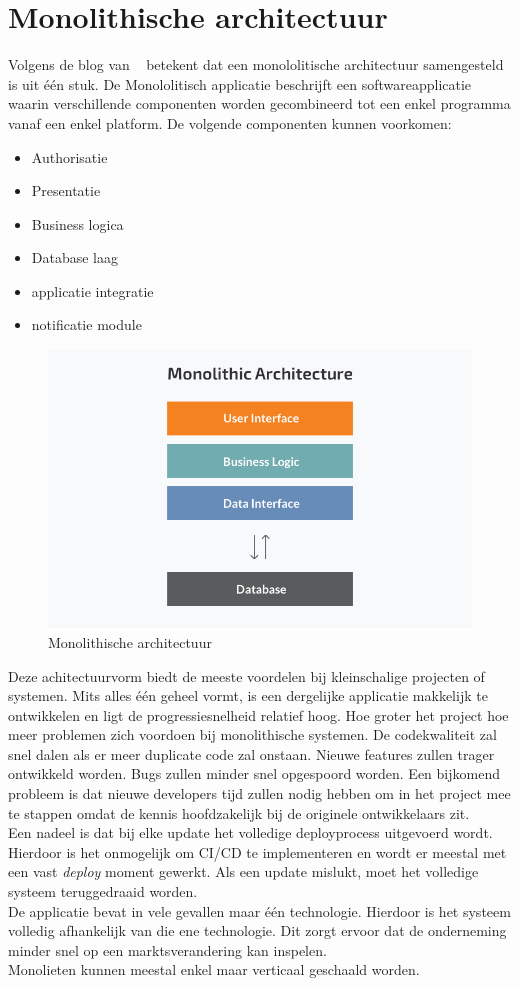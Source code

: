 \section{Monolithische architectuur}
Volgens de blog van ~\autocite{Monolith2014} betekent dat een monololitische architectuur samengesteld is uit één stuk. De Monololitisch applicatie beschrijft een softwareapplicatie waarin verschillende componenten worden gecombineerd tot een enkel programma vanaf een enkel platform. De volgende componenten kunnen voorkomen:
\begin{itemize}
    \item Authorisatie
    \item Presentatie
    \item Business logica
    \item Database laag
    \item applicatie integratie
    \item notificatie module
\end{itemize}
\begin{figure}[!htb]
    \caption{Monolithische architectuur}
    \centering
    \includegraphics[width=1\textwidth]{Monoliet.png}
\end{figure}
Deze achitectuurvorm biedt de meeste voordelen bij kleinschalige projecten of systemen. Mits alles één geheel vormt, is een dergelijke applicatie makkelijk te ontwikkelen en ligt de progressiesnelheid relatief hoog. Hoe groter het project hoe meer problemen zich voordoen bij monolithische systemen. De codekwaliteit zal snel dalen als er meer duplicate code zal onstaan. Nieuwe features zullen trager ontwikkeld worden. Bugs zullen minder snel opgespoord worden. Een bijkomend probleem is dat nieuwe developers tijd zullen nodig hebben om in het project mee te stappen omdat de kennis hoofdzakelijk bij de originele ontwikkelaars zit. \\
Een nadeel is dat bij elke update het volledige deployprocess uitgevoerd wordt. Hierdoor is het onmogelijk om CI/CD te implementeren en wordt er meestal met een vast \emph{deploy} moment gewerkt. Als een update mislukt, moet het volledige systeem teruggedraaid worden.\\
De applicatie bevat in vele gevallen maar één technologie. Hierdoor is het systeem volledig afhankelijk van die ene technologie. Dit zorgt ervoor dat de onderneming minder snel op een marktsverandering kan inspelen.\\
Monolieten kunnen meestal enkel maar verticaal geschaald worden.
